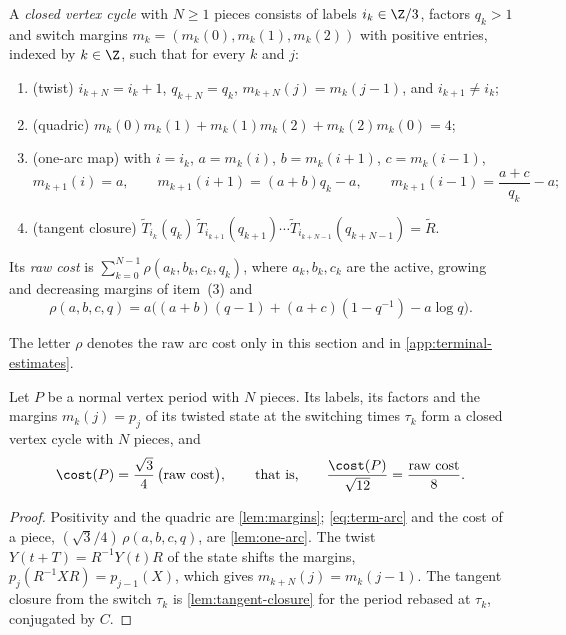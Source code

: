 \begin{definition}\label{def:term-cycle}
A \emph{closed vertex cycle} with $N\ge1$ pieces consists of labels $i_k\in\Z/3$, factors $q_k>1$
and switch margins $m_k=(m_k(0),m_k(1),m_k(2))$ with positive entries, indexed by $k\in\Z$,
such that for every $k$ and $j$:
\begin{enumerate}
\item (twist) $i_{k+N}=i_k+1$, $q_{k+N}=q_k$, $m_{k+N}(j)=m_k(j-1)$, and $i_{k+1}\ne i_k$;
\item (quadric) $m_k(0)m_k(1)+m_k(1)m_k(2)+m_k(2)m_k(0)=4$;
\item (one-arc map) with $i=i_k$, $a=m_k(i)$, $b=m_k(i+1)$, $c=m_k(i-1)$,
 \begin{equation}\label{eq:term-arc}
  m_{k+1}(i)=a,\qquad m_{k+1}(i+1)=(a+b)q_k-a,\qquad m_{k+1}(i-1)=\frac{a+c}{q_k}-a;
 \end{equation}
\item (tangent closure)
 $\widetilde T_{i_k}(q_k)\,\widetilde T_{i_{k+1}}(q_{k+1})\cdots\widetilde T_{i_{k+N-1}}(q_{k+N-1})=\widetilde R$.
\end{enumerate}
Its \emph{raw cost} is $\sum_{k=0}^{N-1}\rho(a_k,b_k,c_k,q_k)$, where $a_k,b_k,c_k$ are the
active, growing and decreasing margins of item~(3) and
\begin{equation}\label{eq:term-rawarc}
 \rho(a,b,c,q)=a\bigl((a+b)(q-1)+(a+c)(1-q^{-1})-a\log q\bigr).
\end{equation}
\end{definition}

The letter $\rho$ denotes the raw arc cost only in this section and in
\cref{app:terminal-estimates}.

\begin{lemma}\label{lem:term-cycle}
Let $P$ be a normal vertex period with $N$ pieces. Its labels, its factors and the margins
$m_k(j)=p_j$ of its twisted state at the switching times $\tau_k$ form a closed vertex cycle with
$N$ pieces, and
\[
 \cost(P)=\frac{\sqrt3}{4}\,\bigl(\text{raw cost}\bigr),\qquad\text{that is,}\qquad
 \frac{\cost(P)}{\sqrt{12}}=\frac{\text{raw cost}}{8}.
\]
\end{lemma}

\begin{proof}
Positivity and the quadric are \cref{lem:margins}; \eqref{eq:term-arc} and the cost of a piece,
$(\sqrt3/4)\,\rho(a,b,c,q)$, are \cref{lem:one-arc}. The twist $Y(t+T)=R^{-1}Y(t)R$ of the state
shifts the margins, $p_j(R^{-1}XR)=p_{j-1}(X)$, which gives $m_{k+N}(j)=m_k(j-1)$. The tangent
closure from the switch $\tau_k$ is \cref{lem:tangent-closure} for the period rebased at
$\tau_k$, conjugated by $C$.
\end{proof}

